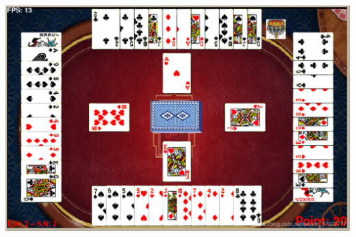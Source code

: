 \documentclass[9pt, b5paper]{article}
\begin{document}
\begin{center}
\includegraphics[width=.9\linewidth]{./pic/plan_20230508_221732.png}
\end{center}
\end{document}
